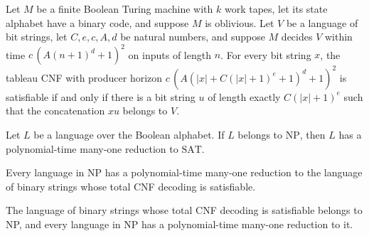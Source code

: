 \begin{lemma}
\label{Complexity.clA5Equisat}
\leanok
{}
Let $M$ be a finite Boolean Turing machine with $k$ work tapes, let its state alphabet
have a binary code, and suppose $M$ is oblivious. Let $V$ be a language of bit strings,
let $C,e,c,A,d$ be natural numbers, and suppose $M$ decides $V$ within time
$c\,(A(n+1)^d+1)^2$ on inputs of length $n$. For every bit string $x$, the tableau CNF
with producer horizon $c\,(A(|x|+C(|x|+1)^e+1)^d+1)^2$ is satisfiable if and only if
there is a bit string $u$ of length exactly $C(|x|+1)^e$ such that the concatenation
$xu$ belongs to $V$.
\end{lemma}

\begin{lemma}
\label{Complexity.clA5Reduction}
\leanok
{}
Let $L$ be a language over the Boolean alphabet. If $L$ belongs to $\mathrm{NP}$, then
$L$ has a polynomial-time many-one reduction to $\mathrm{SAT}$.
\end{lemma}

\begin{theorem}
\label{Complexity.SAT_NPHard}
\leanok
{}
Every language in NP has a polynomial-time many-one reduction to the language of binary
strings whose total CNF decoding is satisfiable.
\end{theorem}

\begin{theorem}
\label{Complexity.SAT_NPComplete}
\leanok
{}
The language of binary strings whose total CNF decoding is satisfiable belongs to NP,
and every language in NP has a polynomial-time many-one reduction to it.
\end{theorem}

